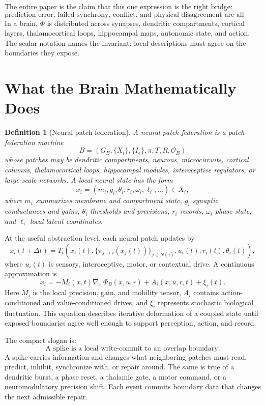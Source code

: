 \documentclass[11pt]{article}
\newtheorem{definition}[theorem]{Definition}
\theoremstyle{remark}
\theoremstyle{plain}
\begin{document}
The entire paper is the claim that this one expression is the right bridge:
\[
\boxed{
\text{prediction error, failed synchrony, conflict, and physical disagreement are all overlap mismatch.}
}
\]
In a brain, \(\Phi\) is distributed across synapses, dendritic compartments, cortical layers, thalamocortical loops, hippocampal maps, autonomic state, and action. The scalar notation names the invariant: local descriptions must agree on the boundaries they expose.

\section{What the Brain Mathematically Does}

\begin{definition}[Neural patch federation]
A neural patch federation is a patch-federation machine
\[
B=(G_B,\{X_i\},\{I_e\},\pi,T,R,\mathcal O_B)
\]
whose patches may be dendritic compartments, neurons, microcircuits, cortical columns, thalamocortical loops, hippocampal modules, interoceptive regulators, or large-scale networks. A local neural state has the form
\[
x_i=(m_i,g_i,\theta_i,r_i,\omega_i,\ell_i,\ldots)\in X_i,
\]
where \(m_i\) summarizes membrane and compartment state, \(g_i\) synaptic conductances and gains, \(\theta_i\) thresholds and precisions, \(r_i\) records, \(\omega_i\) phase state, and \(\ell_i\) local latent coordinates.
\end{definition}

At the useful abstraction level, each neural patch updates by
\[
x_i(t+\Delta t)
=
T_i\!\left(
x_i(t),
\{\pi_{j\to i}(x_j(t))\}_{j\in N(i)},
u_i(t),
r_i(t),
\theta_i(t)
\right),
\]
where \(u_i(t)\) is sensory, interoceptive, motor, or contextual drive. A continuous approximation is
\[
\dot x_i
=
-M_i(x,t)\nabla_{x_i}\Phi_B(x,u,r)
+A_i(x,u,r,t)
+\xi_i(t).
\]
Here \(M_i\) is the local precision, gain, and mobility tensor, \(A_i\) contains action-conditioned and value-conditioned drives, and \(\xi_i\) represents stochastic biological fluctuation. This equation describes iterative deformation of a coupled state until exposed boundaries agree well enough to support perception, action, and record.

The compact slogan is:
\[
\boxed{
\text{A spike is a local write-commit to an overlap boundary.}
}
\]
A spike carries information and changes what neighboring patches must read, predict, inhibit, synchronize with, or repair around. The same is true of a dendritic burst, a phase reset, a thalamic gate, a motor command, or a neuromodulatory precision shift. Each event commits boundary data that changes the next admissible repair.
\end{document}
